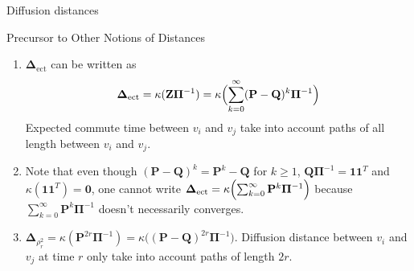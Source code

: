 \documentclass[professionalfonts,hyperref={pdfpagelabels=false,colorlinks=true,linkcolor=red}]{beamer}
\begin{document}
\begin{frame}{Diffusion distances}
\end{frame}
\begin{frame}{Precursor to Other Notions of Distances}
  \begin{enumerate}
  \item<2-> $\bm{\Delta}_{\mathrm{ect}}$ can be written as
    \begin{equation*}
      \bm{\Delta}_{\mathrm{ect}} = \kappa(\mathbf{Z}\bm{\Pi}^{-1}) =
      \kappa\Bigl( \sum_{k=0}^{\infty}(\mathbf{P} -
      \mathbf{Q})^{k}\bm{\Pi}^{-1}\Bigr)
    \end{equation*}
    Expected commute time between $v_i$ and $v_j$ take into account paths of all length
    between $v_i$ and $v_j$. 
  \item<3-> Note that even though $(\mathbf{P} - \mathbf{Q})^{k} =
    \mathbf{P}^{k} - \mathbf{Q}$ for $k \geq 1$,
    $\mathbf{Q}\bm{\Pi}^{-1} = \bm{1}\bm{1}^{T}$ and
    $\kappa(\bm{1}\bm{1}^{T}) = \bm{0}$, one cannot write
    $\bm{\Delta}_{\mathrm{ect}} =
    \kappa\Bigl(\sum_{k=0}^{\infty}\mathbf{P}^{k}\bm{\Pi}^{-1}\Bigr)$
    because $\sum_{k=0}^{\infty}\mathbf{P}^{k}\bm{\Pi}^{-1}$
    doesn't necessarily converges.
    \item<4-> $\bm{\Delta}_{\rho_{r}^{2}} =
      \kappa(\mathbf{P}^{2r}\bm{\Pi}^{-1}) = \kappa\bigl((\mathbf{P} -
      \mathbf{Q})^{2r}\bm{\Pi}^{-1}\bigr)$. Diffusion distance between
      $v_i$ and $v_j$ at time $r$ only take into account paths of
      length $2r$. 
  \end{enumerate}
\end{frame}
\end{document}
